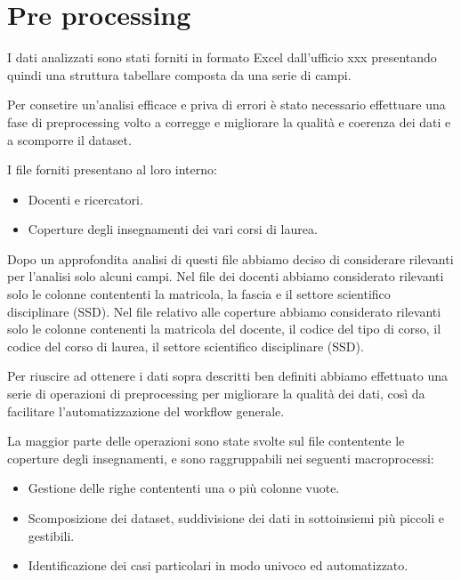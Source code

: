 \section{Pre processing}
\label{sec:pre-proc}




I dati analizzati sono stati forniti in formato Excel dall'ufficio xxx
presentando quindi una struttura tabellare composta da una serie di campi.

Per consetire un'analisi efficace e priva di errori è stato necessario effettuare una fase di
preprocessing volto a corregge e migliorare la qualità e coerenza dei dati e a scomporre il dataset.

I file forniti presentano al loro interno:
\begin{itemize}
    \item Docenti e ricercatori.
    \item Coperture degli insegnamenti dei vari corsi di laurea.
\end{itemize}

Dopo un approfondita analisi di questi file abbiamo deciso di considerare rilevanti per l'analisi solo alcuni campi.
Nel file dei docenti abbiamo considerato rilevanti solo le colonne contententi la matricola, la fascia e
il settore scientifico disciplinare (SSD).
Nel file relativo alle coperture abbiamo considerato rilevanti solo le colonne contenenti
la matricola del docente, il codice del tipo di corso, il codice del corso di laurea, il settore scientifico disciplinare (SSD).

Per riuscire ad ottenere i dati sopra descritti ben definiti abbiamo effettuato una serie di operazioni di preprocessing per migliorare la qualità dei
dati, così da facilitare l'automatizzazione del workflow generale.

La maggior parte delle operazioni sono state svolte sul file contentente le coperture degli insegnamenti, e sono raggruppabili nei seguenti macroprocessi:
\begin{itemize}
    \item Gestione delle righe contententi una o più colonne vuote.
    \item Scomposizione dei dataset, suddivisione dei dati in sottoinsiemi più piccoli e gestibili.
    \item Identificazione dei casi particolari in modo univoco ed automatizzato.
\end{itemize}

